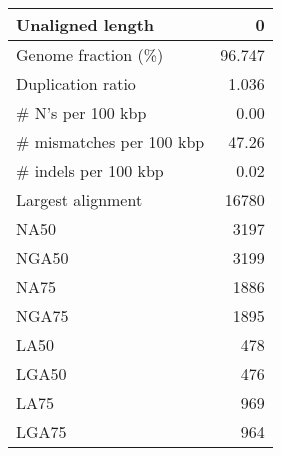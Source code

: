 \documentclass[12pt,a4paper]{article}
\begin{document}
\begin{table}[ht]
\begin{center}
\begin{tabular}{|l*{1}{|r}|}
Unaligned length & 0 \\ \hline
Genome fraction (\%) & 96.747 \\ \hline
Duplication ratio & 1.036 \\ \hline
\# N's per 100 kbp & 0.00 \\ \hline
\# mismatches per 100 kbp & 47.26 \\ \hline
\# indels per 100 kbp & 0.02 \\ \hline
Largest alignment & 16780 \\ \hline
NA50 & 3197 \\ \hline
NGA50 & 3199 \\ \hline
NA75 & 1886 \\ \hline
NGA75 & 1895 \\ \hline
LA50 & 478 \\ \hline
LGA50 & 476 \\ \hline
LA75 & 969 \\ \hline
LGA75 & 964 \\ \hline
\end{tabular}
\end{center}
\end{table}
\end{document}
